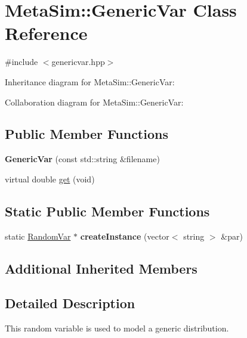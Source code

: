 \hypertarget{classMetaSim_1_1GenericVar}{}\section{Meta\+Sim\+:\+:Generic\+Var Class Reference}
\label{classMetaSim_1_1GenericVar}


{\ttfamily \#include $<$genericvar.\+hpp$>$}



Inheritance diagram for Meta\+Sim\+:\+:Generic\+Var\+:


Collaboration diagram for Meta\+Sim\+:\+:Generic\+Var\+:
\subsection*{Public Member Functions}
\begin{DoxyCompactItemize}
\item 
{\bfseries Generic\+Var} (const std\+::string \&filename)\hypertarget{classMetaSim_1_1GenericVar_adba33779508f887c6a9279cd8e7d271e}{}\label{classMetaSim_1_1GenericVar_adba33779508f887c6a9279cd8e7d271e}

\item 
virtual double \hyperlink{classMetaSim_1_1GenericVar_a0532274062a6b220c2b99e591562cc64}{get} (void)
\end{DoxyCompactItemize}
\subsection*{Static Public Member Functions}
\begin{DoxyCompactItemize}
\item 
static \hyperlink{classMetaSim_1_1RandomVar}{Random\+Var} $\ast$ {\bfseries create\+Instance} (vector$<$ string $>$ \&par)\hypertarget{classMetaSim_1_1GenericVar_a0a5cb5936ba72c2fb6cac60ff6e0b0a5}{}\label{classMetaSim_1_1GenericVar_a0a5cb5936ba72c2fb6cac60ff6e0b0a5}

\end{DoxyCompactItemize}
\subsection*{Additional Inherited Members}


\subsection{Detailed Description}
This random variable is used to model a generic distribution. 

